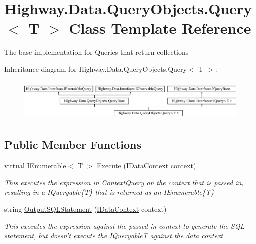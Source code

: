 \hypertarget{class_highway_1_1_data_1_1_query_objects_1_1_query-g}{\section{Highway.\-Data.\-Query\-Objects.\-Query$<$ T $>$ Class Template Reference}
\label{class_highway_1_1_data_1_1_query_objects_1_1_query-g}
}


The base implementation for Queries that return collections  


Inheritance diagram for Highway.\-Data.\-Query\-Objects.\-Query$<$ T $>$\-:\begin{figure}[H]
\begin{center}
\leavevmode
\includegraphics[height=2.089552cm]{class_highway_1_1_data_1_1_query_objects_1_1_query-g}
\end{center}
\end{figure}
\subsection*{Public Member Functions}
\begin{DoxyCompactItemize}
\item 
virtual I\-Enumerable$<$ T $>$ \hyperlink{class_highway_1_1_data_1_1_query_objects_1_1_query-g_a68dd6db173a8ea84d10d72ccc27f74f4}{Execute} (\hyperlink{interface_highway_1_1_data_1_1_interfaces_1_1_i_data_context}{I\-Data\-Context} context)
\begin{DoxyCompactList}\small\item\em This executes the expression in Context\-Query on the context that is passed in, resulting in a I\-Queryable\{\-T\} that is returned as an I\-Enumerable\{\-T\} \end{DoxyCompactList}\item 
string \hyperlink{class_highway_1_1_data_1_1_query_objects_1_1_query-g_a73d9b26cc05e595ea45e5ba03e0812ba}{Output\-S\-Q\-L\-Statement} (\hyperlink{interface_highway_1_1_data_1_1_interfaces_1_1_i_data_context}{I\-Data\-Context} context)
\begin{DoxyCompactList}\small\item\em This executes the expression against the passed in context to generate the S\-Q\-L statement, but doesn't execute the I\-Queryable{\itshape T}  against the data context \end{DoxyCompactList}\end{DoxyCompactItemize}

